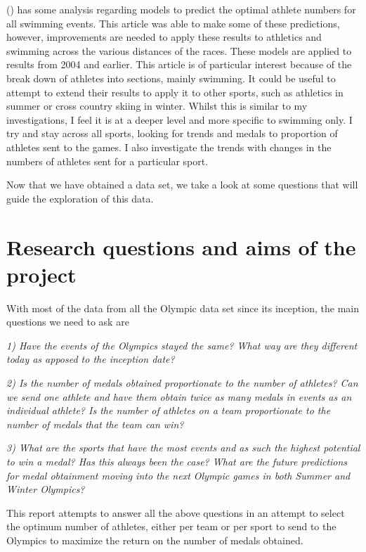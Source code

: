 \documentclass[
]{article}
\begin{document}
() has some analysis regarding models to predict the optimal athlete numbers for all swimming events. This article was able to make some of these predictions, however, improvements are needed to apply these results to athletics and swimming across the various distances of the races. These models are applied to results from 2004 and earlier. This article is of particular interest because of the break down of athletes into sections, mainly swimming. It could be useful to attempt to extend their results to apply it to other sports, such as athletics in summer or cross country skiing in winter. Whilst this is similar to my investigations, I feel it is at a deeper level and more specific to swimming only. I try and stay across all sports, looking for trends and medals to proportion of athletes sent to the games. I also investigate the trends with changes in the numbers of athletes sent for a particular sport.

Now that we have obtained a data set, we take a look at some questions that will guide the exploration of this data.

\newpage

\section*{Research questions and aims of the project}\label{research-questions-and-aims-of-the-project}

With most of the data from all the Olympic data set since its inception, the main questions we need to ask are

\emph{1) Have the events of the Olympics stayed the same? What way are they different today as apposed to the inception date?}

\emph{2) Is the number of medals obtained proportionate to the number of athletes? Can we send one athlete and have them obtain twice as many medals in events as an individual athlete? Is the number of athletes on a team proportionate to the number of medals that the team can win?}

\emph{3) What are the sports that have the most events and as such the highest potential to win a medal? Has this always been the case? What are the future predictions for medal obtainment moving into the next Olympic games in both Summer and Winter Olympics?}

This report attempts to answer all the above questions in an attempt to select the optimum number of athletes, either per team or per sport to send to the Olympics to maximize the return on the number of medals obtained.
\end{document}
